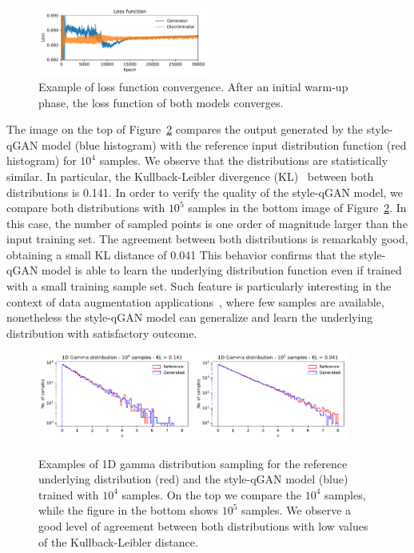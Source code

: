 \documentclass[twocolumn,preprintnumbers,superscriptaddress]{revtex4-2}
\begin{document}
\begin{figure}
  \includegraphics[width=0.5\textwidth]{plots/1Dgamma/1Dgamma_loss.pdf}
  \caption{\label{fig:loss}Example of loss function convergence. After an
  initial warm-up phase, the loss function of both models converges.}
\end{figure}

The image on the top of Figure~\ref{fig:gamma} compares the output generated by
the style-qGAN model (blue histogram) with the reference input distribution function
(red histogram) for $10^4$ samples. We observe that the distributions are
statistically similar. In particular, the Kullback-Leibler divergence
(KL)~\cite{kullback1951information} between both distributions is 0.141.
%
In order to verify the quality of the style-qGAN model, we compare both distributions
with $10^5$ samples in the bottom image of Figure~\ref{fig:gamma}. In this case,
the number of sampled points is one order of magnitude larger than the input
training set. The agreement between both distributions is remarkably good,
obtaining a small KL distance of 0.041
%
This behavior confirms that the style-qGAN model is able to learn the underlying
distribution function even if trained with a small training sample set. Such
feature is particularly interesting in the context of data augmentation
applications~\cite{frid2018synthetic,tanaka2019data}, where few samples are
available, nonetheless the style-qGAN model can generalize and learn the underlying distribution
with satisfactory outcome.

\begin{figure}
  \includegraphics[width=0.45\textwidth]{plots/1Dgamma/1Dgamma_distribution_10k.pdf}
  \includegraphics[width=0.45\textwidth]{plots/1Dgamma/1Dgamma_distribution_100k.pdf}
  \caption{\label{fig:gamma} Examples of 1D gamma distribution sampling for the
  reference underlying distribution (red) and the style-qGAN model (blue) trained with
  $10^4$ samples. On the top we compare the $10^4$ samples, while the figure in
  the bottom shows $10^5$ samples. We observe a good level of agreement between
  both distributions with low values of the Kullback-Leibler distance.}
\end{figure}
\end{document}
